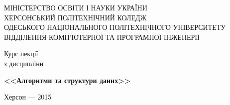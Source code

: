 \begin{titlepage}
\newpage

\begin{center}
МІНІСТЕРСТВО ОСВІТИ І НАУКИ УКРАЇНИ \\

ХЕРСОНСЬКИЙ ПОЛІТЕХНІЧНИЙ КОЛЕДЖ \\

ОДЕСЬКОГО НАЦІОНАЛЬНОГО ПОЛІТЕХНІЧНОГО УНІВЕРСИТЕТУ\\

ВІДДІЛЕННЯ КОМП'ЮТЕРНОЇ ТА ПРОГРАМНОЇ ІНЖЕНЕРІЇ

\end{center}


\vspace{10em}

\begin{center}
\Large Курс лекції \\ з дисципліни
\end{center}

\vspace{2em}

\begin{center}
\huge{\textbf{<<Алгоритми та структури даних>>}}
\end{center}




\vspace{\fill}

\begin{center}
Херсон --- 2015
\end{center}

\end{titlepage}






\tableofcontents


\listoffigures

\listoftables

\lstlistoflistings


